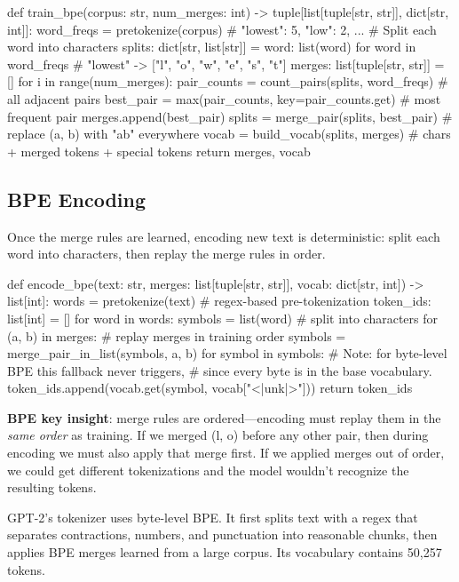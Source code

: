 \begin{pseudocode}
def train_bpe(corpus: str, num_merges: int) -> tuple[list[tuple[str, str]], dict[str, int]]:
    word_freqs = pretokenize(corpus)                # {"lowest": 5, "low": 2, ...}
    # Split each word into characters
    splits: dict[str, list[str]] = {
        word: list(word) for word in word_freqs     # "lowest" -> ["l", "o", "w", "e", "s", "t"]
    }
    merges: list[tuple[str, str]] = []
    for i in range(num_merges):
        pair_counts = count_pairs(splits, word_freqs) # all adjacent pairs
        best_pair = max(pair_counts, key=pair_counts.get) # most frequent pair
        merges.append(best_pair)
        splits = merge_pair(splits, best_pair)      # replace (a, b) with "ab" everywhere
    vocab = build_vocab(splits, merges)             # chars + merged tokens + special tokens
    return merges, vocab
\end{pseudocode}

\subsection{BPE Encoding}

Once the merge rules are learned, encoding new text is deterministic:
split each word into characters, then replay the merge rules in order.

\begin{pseudocode}
def encode_bpe(text: str, merges: list[tuple[str, str]], vocab: dict[str, int]) -> list[int]:
    words = pretokenize(text)                       # regex-based pre-tokenization
    token_ids: list[int] = []
    for word in words:
        symbols = list(word)                        # split into characters
        for (a, b) in merges:                        # replay merges in training order
            symbols = merge_pair_in_list(symbols, a, b)
        for symbol in symbols:
            # Note: for byte-level BPE this fallback never triggers,
            # since every byte is in the base vocabulary.
            token_ids.append(vocab.get(symbol, vocab["<|unk|>"]))
    return token_ids
\end{pseudocode}

\begin{keyconcept}
  \textbf{BPE key insight}: merge rules are ordered---encoding must
  replay them in the \emph{same order} as training. If we merged (l, o)
  before any other pair, then during encoding we must also apply that
  merge first. If we applied merges out of order, we could get different
  tokenizations and the model wouldn't recognize the resulting tokens.

  GPT-2's tokenizer uses byte-level BPE. It first splits text with a
  regex that separates contractions, numbers, and punctuation into
  reasonable chunks, then applies BPE merges learned from a large corpus.
  Its vocabulary contains 50,257 tokens.
\end{keyconcept}

